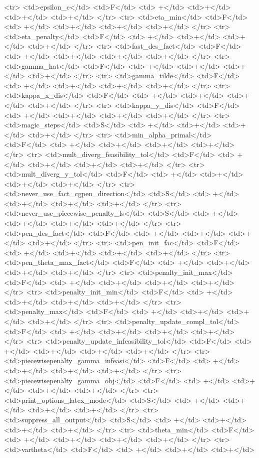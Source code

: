 {{<tr>
<td>epsilon_c</td>
<td>F</td>
<td> +</td>
<td>+</td>
<td>+</td>
<td>+</td>
</tr>
<tr>
<td>eta_min</td>
<td>F</td>
<td> +</td>
<td>+</td>
<td>+</td>
<td>+</td>
</tr>
<tr>
<td>eta_penalty</td>
<td>F</td>
<td> +</td>
<td>+</td>
<td>+</td>
<td>+</td>
</tr>
<tr>
<td>fast_des_fact</td>
<td>F</td>
<td> +</td>
<td>+</td>
<td>+</td>
<td>+</td>
</tr>
<tr>
<td>gamma_hat</td>
<td>F</td>
<td> +</td>
<td>+</td>
<td>+</td>
<td>+</td>
</tr>
<tr>
<td>gamma_tilde</td>
<td>F</td>
<td> +</td>
<td>+</td>
<td>+</td>
<td>+</td>
</tr>
<tr>
<td>kappa_x_dis</td>
<td>F</td>
<td> +</td>
<td>+</td>
<td>+</td>
<td>+</td>
</tr>
<tr>
<td>kappa_y_dis</td>
<td>F</td>
<td> +</td>
<td>+</td>
<td>+</td>
<td>+</td>
</tr>
<tr>
<td>magic_steps</td>
<td>S</td>
<td> +</td>
<td>+</td>
<td>+</td>
<td>+</td>
</tr>
<tr>
<td>min_alpha_primal</td>
<td>F</td>
<td> +</td>
<td>+</td>
<td>+</td>
<td>+</td>
</tr>
<tr>
<td>mult_diverg_feasibility_tol</td>
<td>F</td>
<td> +</td>
<td>+</td>
<td>+</td>
<td>+</td>
</tr>
<tr>
<td>mult_diverg_y_tol</td>
<td>F</td>
<td> +</td>
<td>+</td>
<td>+</td>
<td>+</td>
</tr>
<tr>
<td>never_use_fact_cgpen_direction</td>
<td>S</td>
<td> +</td>
<td>+</td>
<td>+</td>
<td>+</td>
</tr>
<tr>
<td>never_use_piecewise_penalty_ls</td>
<td>S</td>
<td> +</td>
<td>+</td>
<td>+</td>
<td>+</td>
</tr>
<tr>
<td>pen_des_fact</td>
<td>F</td>
<td> +</td>
<td>+</td>
<td>+</td>
<td>+</td>
</tr>
<tr>
<td>pen_init_fac</td>
<td>F</td>
<td> +</td>
<td>+</td>
<td>+</td>
<td>+</td>
</tr>
<tr>
<td>pen_theta_max_fact</td>
<td>F</td>
<td> +</td>
<td>+</td>
<td>+</td>
<td>+</td>
</tr>
<tr>
<td>penalty_init_max</td>
<td>F</td>
<td> +</td>
<td>+</td>
<td>+</td>
<td>+</td>
</tr>
<tr>
<td>penalty_init_min</td>
<td>F</td>
<td> +</td>
<td>+</td>
<td>+</td>
<td>+</td>
</tr>
<tr>
<td>penalty_max</td>
<td>F</td>
<td> +</td>
<td>+</td>
<td>+</td>
<td>+</td>
</tr>
<tr>
<td>penalty_update_compl_tol</td>
<td>F</td>
<td> +</td>
<td>+</td>
<td>+</td>
<td>+</td>
</tr>
<tr>
<td>penalty_update_infeasibility_tol</td>
<td>F</td>
<td> +</td>
<td>+</td>
<td>+</td>
<td>+</td>
</tr>
<tr>
<td>piecewisepenalty_gamma_infeasi</td>
<td>F</td>
<td> +</td>
<td>+</td>
<td>+</td>
<td>+</td>
</tr>
<tr>
<td>piecewisepenalty_gamma_obj</td>
<td>F</td>
<td> +</td>
<td>+</td>
<td>+</td>
<td>+</td>
</tr>
<tr>
<td>print_options_latex_mode</td>
<td>S</td>
<td> +</td>
<td>+</td>
<td>+</td>
<td>+</td>
</tr>
<tr>
<td>suppress_all_output</td>
<td>S</td>
<td> +</td>
<td>+</td>
<td>+</td>
<td>+</td>
</tr>
<tr>
<td>theta_min</td>
<td>F</td>
<td> +</td>
<td>+</td>
<td>+</td>
<td>+</td>
</tr>
<tr>
<td>vartheta</td>
<td>F</td>
<td> +</td>
<td>+</td>
<td>+</td>
}}
